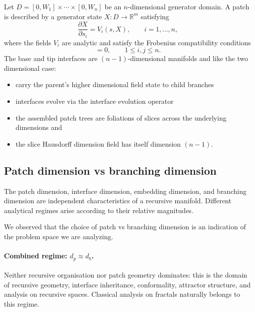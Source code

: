 \documentclass[11pt,a4paper]{article}
\begin{document}
Let $D = [0,W_1]\times\cdots\times[0,W_n]$ be an $n$-dimensional
generator domain. A patch is described by a generator state
$X : D \to \mathbb{R}^m$ satisfying
\begin{equation}
    \frac{\partial X}{\partial s_i} = V_i(s,X),
    \qquad i = 1,\ldots,n,
    \label{eq:agn_generator}
\end{equation}
where the fields $V_i$ are analytic and satisfy the Frobenius
compatibility conditions
\begin{equation}
    [V_i, V_j] = 0, \qquad 1 \leq i,j \leq n.
    \label{eq:agn_frobenius}
\end{equation}
The base and tip interfaces are $(n-1)$-dimensional manifolds and like the 
two dimensional case:
\begin{itemize}
\item carry the parent's higher dimensional field state to child branches
\item interfaces evolve via the interface evolution operator 
\item the assembled patch trees are foliations of slices across the underlying 
dimensions and 
\item the slice Hausdorff dimension field has itself dimension $(n-1)$.
\end{itemize}
\subsection{Patch dimension vs branching dimension}
\label{sec:patch_tree_dim}
The patch dimension, interface dimension, embedding dimension, and branching dimension are
independent characteristics of a recursive manifold. Different analytical regimes arise 
according to their relative magnitudes.

We observed that the choice of patch vs branching dimension is an indication 
of the problem space we are analyzing.

\paragraph{Combined regime: $d_p \approx d_b$.}
Neither recursive organisation nor patch geometry dominates: this is the domain of
recursive geometry, interface inheritance, conformality, attractor structure, and analysis 
on recursive spaces. Classical analysis on fractals naturally belongs to this regime.
\end{document}
